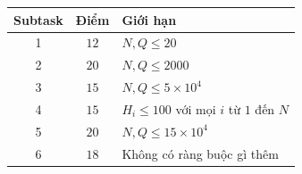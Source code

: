 \begin{center}
  \begin{tabular}{|c|c|l|} \hline
    \textbf{Subtask} & \textbf{Điểm} & \textbf{Giới hạn} \\ \hline
    1 & $12$ & $N,Q\le 20$ \\ \hline
    2 & $20$ & $N,Q\le 2000$ \\ \hline
    3 & $15$ & $N,Q\le 5\times 10^4$ \\ \hline
    4 & $15$ & $H_i\le 100$ với mọi $i$ từ $1$ đến $N$ \\ \hline
    5 & $20$ & $N,Q\le 15\times 10^4$ \\ \hline
    6 & $18$ & Không có ràng buộc gì thêm \\ \hline
  \end{tabular}
\end{center}